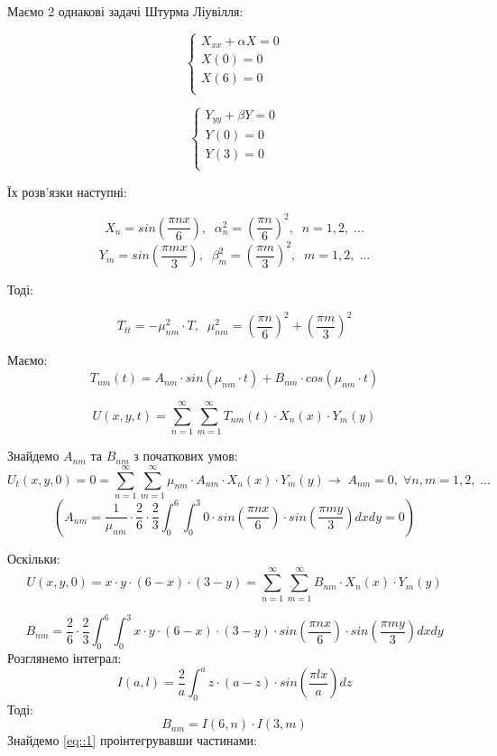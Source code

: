 \documentclass[]{article}
\begin{document}
Маємо 2 однакові задачі Штурма Ліувілля:
\begin{multicols}{2}

    \begin{equation*}
        \begin{cases}
        X_{xx}+\alpha X = 0\\
        X(0)=0\\
        X(6)=0\\
        \end{cases}
    \end{equation*}

    \begin{equation*}
        \begin{cases}
        Y_{yy}+\beta Y = 0\\
        Y(0)=0\\
        Y(3)=0\\
        \end{cases}
    \end{equation*}
\end{multicols}

Їх розв'язки наступні:

\[X_n = sin\left(\frac{\pi n x}{6}\right),\;\;\alpha_n^2 = \left(\frac{\pi n}{6}\right)^2,\;\;n=1,2,\;...\]
\[Y_m = sin\left(\frac{\pi m x}{3}\right),\;\;\beta_m^2 = \left(\frac{\pi m}{3}\right)^2,\;\;m=1,2,\;...\]

Тоді:

\[T_{tt} = -\mu_{nm}^2\cdot T, \;\; \mu_{nm}^2=\left(\frac{\pi n}{6}\right)^2+\left(\frac{\pi m}{3}\right)^2\]

Маємо:
\[T_{nm}(t)=A_{nm}\cdot sin(\mu_{nm}\cdot t) + B_{nm}\cdot cos (\mu_{nm}\cdot t)\]

\[U(x,y,t) = \sum_{n=1}^{\infty}\sum_{m=1}^{\infty}T_{nm}(t)\cdot X_n(x)\cdot Y_m(y)\]

\newpage

Знайдемо $A_{nm}$ та $B_{nm}$ з початкових умов:
\[U_t(x,y,0) = 0 = \sum_{n=1}^{\infty}\sum_{m=1}^{\infty}\mu_{nm}\cdot A_{nm}\cdot X_n(x)\cdot Y_m(y)\rightarrow\;A_{nm} = 0, \;\forall n,m = 1,2,\;...\]
\[\left(A_{nm} = \frac{1}{\mu_{nm}}\cdot\frac{2}{6}\cdot\frac{2}{3}\int_{0}^{6}\int_{0}^{3}0\cdot sin\left(\frac{\pi n x}{6}\right)\cdot sin\left(\frac{\pi m y}{3}\right) dxdy = 0\right)\]

Оскільки:
\[U(x,y,0) = x\cdot y\cdot (6-x)\cdot (3-y) = \sum_{n=1}^{\infty}\sum_{m=1}^{\infty}B_{nm}\cdot X_n(x)\cdot Y_m(y)\]

\[B_{nm} = \frac{2}{6}\cdot\frac{2}{3}\int_{0}^{6}\int_{0}^{3}x\cdot y\cdot (6-x)\cdot (3-y)\cdot sin\left(\frac{\pi n x}{6}\right)\cdot sin\left(\frac{\pi m y}{3}\right) dxdy\]
Розглянемо інтеграл:
\begin{equation}
    I(a,l) = \frac{2}{a}\int_{0}^{a}z\cdot(a-z)\cdot sin\left(\frac{\pi l x}{a}\right)dz    
    \label{eq::1}
\end{equation}
Тоді:
\[B_{nm} = I(6,n)\cdot I(3,m)\]
Знайдемо \ref{eq::1} проінтегрувавши частинами:
\end{document}
